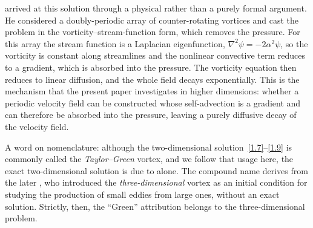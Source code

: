 \documentclass[11pt]{jfm}
\numberwithin{equation}{section}
\begin{document}
\citet{tay} arrived at this solution through a physical rather than a purely formal argument. He considered a doubly-periodic array of counter-rotating vortices and cast the problem in the vorticity--stream-function form, which removes the pressure. For this array the stream function is a Laplacian eigenfunction, $\nabla^2\psi=-2\alpha^2\psi$, so the vorticity is constant along streamlines and the nonlinear convective term reduces to a
gradient, which is absorbed into the pressure. The vorticity equation then reduces to linear diffusion, and the whole field decays exponentially. This is the mechanism that the present
paper investigates in higher dimensions: whether a periodic velocity field can be constructed
whose self-advection is a gradient and can therefore be absorbed into the pressure, leaving a
purely diffusive decay of the velocity field.

A word on nomenclature: although the two-dimensional solution~\eqref{1.7}--\eqref{1.9} is commonly called the \emph{Taylor--Green} vortex, and we follow that usage here, the exact two-dimensional solution is due to \citet{tay} alone. The compound name derives from the later \citet{taygre}, who introduced the \emph{three-dimensional} vortex as an initial condition for studying the production of small eddies from large ones, without an exact solution. Strictly, then, the ``Green'' attribution belongs to the three-dimensional problem.
\end{document}

